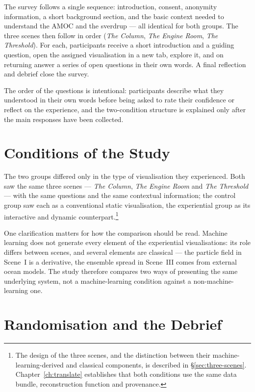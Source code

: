 The survey follows a single sequence: introduction, consent, anonymity information, a short background section, and the basic context needed to understand the AMOC and the sverdrup --- all identical for both groups. The three scenes then follow in order (\textit{The Column}, \textit{The Engine Room}, \textit{The Threshold}). For each, participants receive a short introduction and a guiding question, open the assigned visualisation in a new tab, explore it, and on returning answer a series of open questions in their own words. A final reflection and debrief close the survey.

The order of the questions is intentional: participants describe what they understood in their own words before being asked to rate their confidence or reflect on the experience, and the two-condition structure is explained only after the main responses have been collected.

\section{Conditions of the Study}
\label{sec:eval-conditions}

The two groups differed only in the type of visualisation they experienced. Both saw the same three scenes --- \textit{The Column}, \textit{The Engine Room} and \textit{The Threshold} --- with the same questions and the same contextual information; the control group saw each as a conventional static visualisation, the experiential group as its interactive and dynamic counterpart.\footnote{The design of the three scenes, and the distinction between their machine-learning-derived and classical components, is described in \S\ref{sec:three-scenes}. Chapter~\ref{ch:translate} establishes that both conditions use the same data bundle, reconstruction function and provenance.}

One clarification matters for how the comparison should be read. Machine learning does not generate every element of the experiential visualisations: its role differs between scenes, and several elements are classical --- the particle field in Scene~I is a derivative, the ensemble spread in Scene~III comes from external ocean models. The study therefore compares two ways of presenting the same underlying system, not a machine-learning condition against a non-machine-learning one.

\section{Randomisation and the Debrief}
\label{sec:eval-randomisation}

